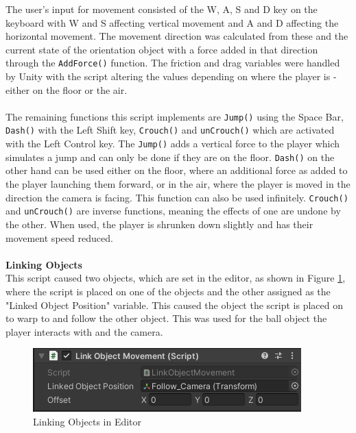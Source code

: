 \noindent The user's input for movement consisted of the W, A, S and D key on the keyboard with W and S affecting vertical movement and A and D affecting the horizontal movement. The movement direction was calculated from these and the current state of the orientation object with a force added in that direction through the \texttt{AddForce()} function. The friction and drag variables were handled by Unity with the script altering the values depending on where the player is - either on the floor or the air. 
\\\\
The remaining functions this script implements are \texttt{Jump()} using the Space Bar, \texttt{Dash()} with the Left Shift key, \texttt{Crouch()} and \texttt{unCrouch()} which are activated with the Left Control key. The \texttt{Jump()} adds a vertical force to the player which simulates a jump and can only be done if they are on the floor. \texttt{Dash()} on the other hand can be used either on the floor, where an additional force as added to the player launching them forward, or in the air, where the player is moved in the direction the camera is facing. This function can also be used infinitely. \texttt{Crouch()} and \texttt{unCrouch()} are inverse functions, meaning the effects of one are undone by the other. When used, the player is shrunken down slightly and has their movement speed reduced.
\\\\
\textbf{Linking Objects}\\
This script caused two objects, which are set in the editor, as shown in Figure \ref{link}, where the script is placed on one of the objects and the other assigned as the "Linked Object Position" variable. This caused the object the script is placed on to warp to and follow the other object. This was used for the ball object the player interacts with and the camera.

\begin{figure}[H]
\centering
\includegraphics[scale=1]{Figures/link.png}
\caption{Linking Objects in Editor}
\label{link}
\end{figure}

